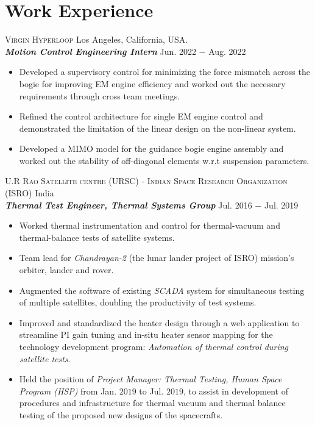 \documentclass[letterpaper,10pt]{article}
\begin{document}
\section{Work Experience}
\noindent \textsc{Virgin Hyperloop} \hfill Los Angeles, California, USA.\\
\vspace{3pt}
\textbf{\textit{Motion Control Engineering Intern}} \hfill Jun. 2022 $-$ Aug. 2022
\begin{itemize}[noitemsep,nolistsep,leftmargin=0.25in,label={--}]
    \item Developed a supervisory control for minimizing the force mismatch
across the bogie for improving EM engine efficiency and worked out the necessary
requirements through cross team meetings.
\item Refined the control architecture for single EM engine control and
demonstrated the limitation of the linear design on the non-linear system.
\item Developed a MIMO model for the guidance bogie engine assembly and worked
out the stability of off-diagonal elements w.r.t suspension parameters.
\end{itemize}
\vspace{10pt}
\noindent \textsc{U.R Rao Satellite centre (URSC) - Indian Space Research Organization (ISRO)} \hfill India \\
\vspace{3pt}
\textbf{\textit{Thermal Test Engineer, Thermal Systems Group}} \hfill Jul. 2016 $-$ Jul. 2019
\begin{itemize}[noitemsep,nolistsep,leftmargin=0.25in,label={--}]
    \item Worked thermal instrumentation and control for thermal-vacuum and thermal-balance tests of satellite systems.
	\item Team lead for \textit{Chandrayan-2} (the lunar lander project of ISRO) mission's orbiter, lander and rover.
    \item Augmented the software of existing \textit{SCADA} system for simultaneous testing of multiple satellites, doubling the productivity of test systems.
	\item Improved and standardized the heater design through a web application to streamline PI gain tuning and in-situ heater sensor mapping for the technology development program: \textit{Automation of thermal control during satellite tests}.
    \item Held the position of \textit{Project Manager: Thermal Testing, Human Space Program (HSP)} from Jan. $2019$ to Jul. $2019$, to assist in development of procedures and infrastructure for thermal vacuum and thermal balance testing of the proposed new designs of the spacecrafts.\\
\end{itemize}
\end{document}
